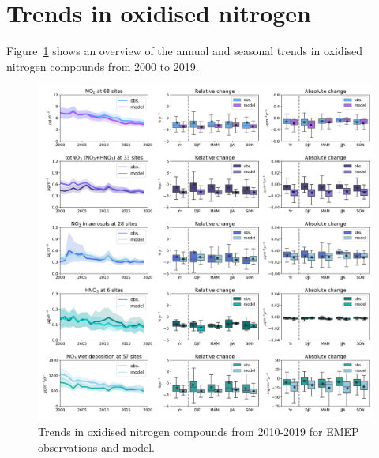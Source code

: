 \section{\label{sec:Trends_oxidised_nitrogen }Trends in oxidised nitrogen}

Figure~\ref{fig:NOx_trends} shows an overview of the annual and seasonal trends in oxidised nitrogen compounds from 2000 to 2019.

\begin{figure}
	\centering
	\includegraphics[width=0.74\paperwidth]{FIGS_TRENDS/Nox_trends.png}
	\caption{\label{fig:NOx_trends}Trends in oxidised nitrogen compounds from 2010-2019 for EMEP observations and model.}
\end{figure}


